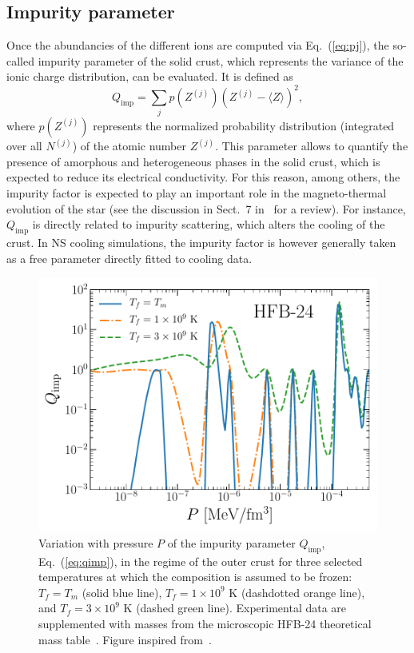 \subsection{Impurity parameter}\label{subsec:qimp_ocrust}

Once the abundancies of the different ions are computed via Eq.~(\ref{eq:pj}), 
the so-called impurity parameter of the solid crust, which represents the 
variance of the ionic charge distribution, can be evaluated. It is defined
as~\cite{Meisel2018}
%
\begin{equation}
  Q_{\text{imp}} = \sum_j p(Z^{(j)})(Z^{(j)}-\langle Z
  \rangle)^2,\label{eq:qimp}
\end{equation}
%
where $p(Z^{(j)})$ represents the normalized probability distribution 
(integrated over all $N^{(j)}$) of the atomic number $Z^{(j)}$.
This parameter allows to quantify the presence of amorphous and
heterogeneous phases in the solid crust, which is expected to reduce its 
electrical conductivity. For this reason, among others, the impurity factor is 
expected to play an important role in the magneto-thermal evolution of the star 
(see the discussion in Sect.~7 in~\cite{Meisel2018} for a review). For 
instance, $Q_{\text{imp}}$ is directly related to impurity scattering, which 
alters the cooling of the crust.
In NS cooling simulations, the impurity factor is however generally taken as 
a free parameter directly fitted to cooling data.

\begin{figure}[!t]
  \begin{center}
    \includegraphics[width=0.9\linewidth]{figures/qimp_ocrust.pdf}
  \end{center}
  \caption[Impurity parameter versus pressure in the outer-crust regime]{
    Variation with pressure $P$ of the impurity parameter $Q_{\text{imp}}$,
    Eq.~(\ref{eq:qimp}), in the regime of the outer crust for three selected
    temperatures at which the composition is assumed to be frozen: 
    $T_f=T_m$ (solid blue line),
    $T_f=1\times 10^9$ \si{\kelvin} (dashdotted orange line), and 
    $T_f=3\times 10^9$ \si{\kelvin} (dashed green line).
    Experimental data are supplemented with masses from the microscopic 
    HFB-24 theoretical mass table~\cite{Goriely2013}. 
  Figure inspired from~\cite{Fantina2020}.}\label{fig:qimp_ocrust}
\end{figure}

